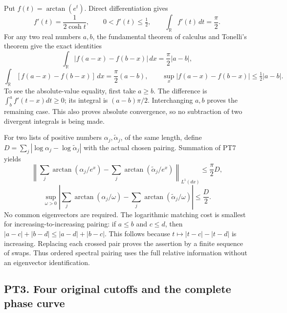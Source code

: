 \documentclass[10pt]{article}
\begin{document}
Put \(f(t)=\arctan(e^t)\). Direct differentiation gives \[
 f'(t)=\frac1{2\cosh t},\qquad 0<f'(t)\le\tfrac12,
 \qquad\int_{\mathbb R}f'(t)\,dt=\frac\pi2.
 \tag{PT6}
\] For any two real numbers \(a,b\), the fundamental theorem of calculus and Tonelli's theorem give the exact identities \[
 \int_{\mathbb R}|f(a-x)-f(b-x)|\,dx=\frac\pi2|a-b|,
\] \[
 \int_{\mathbb R}[f(a-x)-f(b-x)]\,dx=\frac\pi2(a-b),
 \qquad\sup_x|f(a-x)-f(b-x)|\le\tfrac12|a-b|.
 \tag{PT7}
\] To see the absolute-value equality, first take \(a\ge b\). The difference is \(\int_b^a f'(t-x)dt\ge0\); its integral is \((a-b)\pi/2\). Interchanging \(a,b\) proves the remaining case. This also proves absolute convergence, so no subtraction of two divergent integrals is being made.

For two lists of positive numbers \(\alpha_j,\widetilde\alpha_j\), of the same length, define \(D=\sum_j|\log\alpha_j-\log\widetilde\alpha_j|\) with the actual chosen pairing. Summation of PT7 yields \[
 \left\|\sum_j\arctan(\alpha_j/e^x)
              -\sum_j\arctan(\widetilde\alpha_j/e^x)\right\|_{L^1(dx)}
 \le\frac\pi2D,
\] \[
 \sup_{\omega>0}\left|\sum_j\arctan(\alpha_j/\omega)
                 -\sum_j\arctan(\widetilde\alpha_j/\omega)\right|
 \le\frac D2.
 \tag{PT8}
\] No common eigenvectors are required. The logarithmic matching cost is smallest for increasing-to-increasing pairing: if \(a\le b\) and \(c\le d\), then \(|a-c|+|b-d|\le|a-d|+|b-c|\). This follows because \(t\mapsto|t-c|-|t-d|\) is increasing. Replacing each crossed pair proves the assertion by a finite sequence of swaps. Thus ordered spectral pairing uses the full relative information without an eigenvector identification.

\subsection{PT3. Four original cutoffs and the complete phase curve}\label{pt3.-four-original-cutoffs-and-the-complete-phase-curve}
\end{document}
